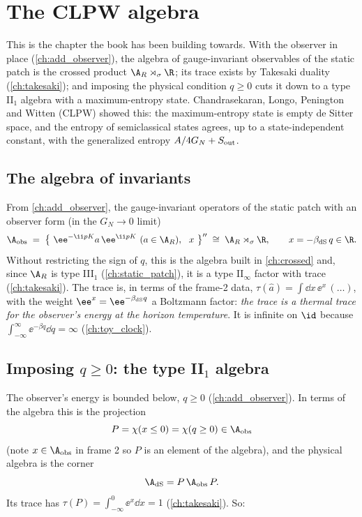 \chapter{The CLPW algebra}\label{ch:clpw}

\begin{physmotiv}
This is the chapter the book has been building towards. With the observer in place (\cref{ch:add_observer}), the algebra of gauge-invariant observables of the static patch is the crossed product $\A_R\rtimes_\sigma\R$; its trace exists by Takesaki duality (\cref{ch:takesaki}); and imposing the physical condition $q\ge0$ cuts it down to a type II$_1$ algebra with a maximum-entropy state. Chandrasekaran, Longo, Penington and Witten (CLPW) \cite{CLPW2023} showed this: the maximum-entropy state is empty de Sitter space, and the entropy of semiclassical states agrees, up to a state-independent constant, with the generalized entropy $A/4G_N+S_{\rm out}$.
\end{physmotiv}

\section{The algebra of invariants}

From \cref{ch:add_observer}, the gauge-invariant operators of the static patch with an observer form (in the $G_N\to0$ limit)
\begin{equation}
\A_{\rm obs}\;=\;\big\{\ \ee^{-\ii pK}a\,\ee^{\ii pK}\ (a\in\A_R),\ \ x\ \big\}''\;\cong\;\A_R\rtimes_\sigma\R,\qquad x=-\beta_{\rm dS}\,q\in\R.
\end{equation}
Without restricting the sign of $q$, this is the algebra built in \cref{ch:crossed} and, since $\A_R$ is type III$_1$ (\cref{ch:static_patch}), it is a type II$_\infty$ factor with trace (\cref{ch:takesaki}). The trace is, in terms of the frame-2 data, $\tau(\hat a)=\int\dd x\,\ee^{x}\,(\ldots)$, with the weight $\ee^{x}=\ee^{-\beta_{\rm dS}q}$ a Boltzmann factor: \emph{the trace is a thermal trace for the observer's energy at the horizon temperature}. It is infinite on $\id$ because $\int_{-\infty}^\infty\ee^{-\beta q}\dd q=\infty$ (\cref{ch:toy_clock}).

\section{Imposing $q\ge0$: the type II$_1$ algebra}

The observer's energy is bounded below, $q\ge0$ (\cref{ch:add_observer}). In terms of the algebra this is the projection
\begin{equation}
P=\chi(x\le0)=\chi(q\ge0)\in\A_{\rm obs}
\end{equation}
(note $x\in\A_{\rm obs}$ in frame 2 so $P$ is an element of the algebra), and the physical algebra is the corner
\begin{equation}
\A_{\rm dS}=P\,\A_{\rm obs}\,P.
\end{equation}
Its trace has $\tau(P)=\int_{-\infty}^0\ee^{x}\dd x=1$ (\cref{ch:takesaki}). So:


